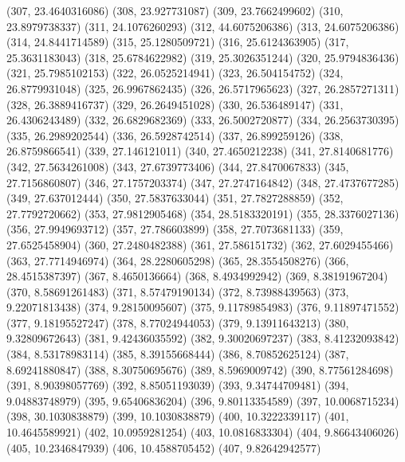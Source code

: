 {					(307, 23.4640316086)
					(308, 23.927731087)
					(309, 23.7662499602)
					(310, 23.8979738337)
					(311, 24.1076260293)
					(312, 44.6075206386)
					(313, 24.6075206386)
					(314, 24.8441714589)
					(315, 25.1280509721)
					(316, 25.6124363905)
					(317, 25.3631183043)
					(318, 25.6784622982)
					(319, 25.3026351244)
					(320, 25.9794836436)
					(321, 25.7985102153)
					(322, 26.0525214941)
					(323, 26.504154752)
					(324, 26.8779931048)
					(325, 26.9967862435)
					(326, 26.5717965623)
					(327, 26.2857271311)
					(328, 26.3889416737)
					(329, 26.2649451028)
					(330, 26.536489147)
					(331, 26.4306243489)
					(332, 26.6829682369)
					(333, 26.5002720877)
					(334, 26.2563730395)
					(335, 26.2989202544)
					(336, 26.5928742514)
					(337, 26.899259126)
					(338, 26.8759866541)
					(339, 27.146121011)
					(340, 27.4650212238)
					(341, 27.8140681776)
					(342, 27.5634261008)
					(343, 27.6739773406)
					(344, 27.8470067833)
					(345, 27.7156860807)
					(346, 27.1757203374)
					(347, 27.2747164842)
					(348, 27.4737677285)
					(349, 27.637012444)
					(350, 27.5837633044)
					(351, 27.7827288859)
					(352, 27.7792720662)
					(353, 27.9812905468)
					(354, 28.5183320191)
					(355, 28.3376027136)
					(356, 27.9949693712)
					(357, 27.786603899)
					(358, 27.7073681133)
					(359, 27.6525458904)
					(360, 27.2480482388)
					(361, 27.586151732)
					(362, 27.6029455466)
					(363, 27.7714946974)
					(364, 28.2280605298)
					(365, 28.3554508276)
					(366, 28.4515387397)
					(367, 8.4650136664)
					(368, 8.4934992942)
					(369, 8.38191967204)
					(370, 8.58691261483)
					(371, 8.57479190134)
					(372, 8.73988439563)
					(373, 9.22071813438)
					(374, 9.28150095607)
					(375, 9.11789854983)
					(376, 9.11897471552)
					(377, 9.18195527247)
					(378, 8.77024944053)
					(379, 9.13911643213)
					(380, 9.32809672643)
					(381, 9.42436035592)
					(382, 9.30020697237)
					(383, 8.41232093842)
					(384, 8.53178983114)
					(385, 8.39155668444)
					(386, 8.70852625124)
					(387, 8.69241880847)
					(388, 8.30750695676)
					(389, 8.5969009742)
					(390, 8.77561284698)
					(391, 8.90398057769)
					(392, 8.85051193039)
					(393, 9.34744709481)
					(394, 9.04883748979)
					(395, 9.65406836204)
					(396, 9.80113354589)
					(397, 10.0068715234)
					(398, 30.1030838879)
					(399, 10.1030838879)
					(400, 10.3222339117)
					(401, 10.4645589921)
					(402, 10.0959281254)
					(403, 10.0816833304)
					(404, 9.86643406026)
					(405, 10.2346847939)
					(406, 10.4588705452)
					(407, 9.82642942577)
}
